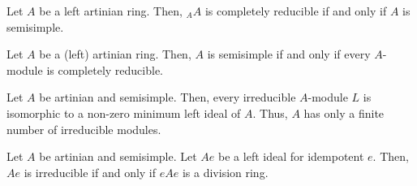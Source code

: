 \documentclass[11pt,leqno,oneside]{amsbook}
\numberwithin{thm}{section}
\begin{document}
\begin{thm}
  Let \(A\) be a left artinian ring. Then, \({}_A A\) is completely
  reducible if and only if \(A\) is semisimple.
\end{thm}
\begin{thm}
  Let \(A\) be a (left) artinian ring. Then, \(A\) is semisimple if
  and only if every \(A\)-module is completely reducible.
\end{thm}
\begin{thm}
  Let \(A\) be artinian and semisimple. Then, every irreducible
  \(A\)-module \(L\) is isomorphic to a non-zero minimum left ideal of
  \(A\). Thus, \(A\) has only a finite number of irreducible modules.
\end{thm}
\begin{thm}
  Let \(A\) be artinian and semisimple. Let \(Ae\) be a left ideal for
  idempotent \(e\). Then, \(Ae\) is irreducible if and only if \(eAe\)
  is a division ring.
\end{thm}
\end{document}

